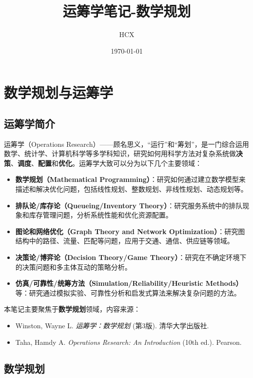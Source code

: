 \documentclass[12pt]{article}
\title{运筹学笔记-数学规划}
\author{HCX}
\date{\today}
\theoremstyle{plain}
\theoremstyle{definition}
\begin{document}
\pagestyle{fancy}

\maketitle

\tableofcontents
\newpage

\section{数学规划与运筹学}\label{sec:math_or}

\subsection{运筹学简介}\label{subsec:or_intro}

运筹学（Operations Research）——顾名思义，“运行”和“筹划”，是一门综合运用数学、统计学、计算机科学等多学科知识，研究如何用科学方法对复杂系统做\textbf{决策}、\textbf{调度}、\textbf{配置}和\textbf{优化}。运筹学大致可以分为以下几个主要领域：
\begin{itemize}
    \item \textbf{数学规划（Mathematical Programming）}：研究如何通过建立数学模型来描述和解决优化问题，包括线性规划、整数规划、非线性规划、动态规划等。
    \item \textbf{排队论/库存论（Queueing/Inventory Theory）}：研究服务系统中的排队现象和库存管理问题，分析系统性能和优化资源配置。
    \item \textbf{图论和网络优化（Graph Theory and Network Optimization）}：研究图结构中的路径、流量、匹配等问题，应用于交通、通信、供应链等领域。
    \item \textbf{决策论/博弈论（Decision Theory/Game Theory）}：研究在不确定环境下的决策问题和多主体互动的策略分析。
    \item \textbf{仿真/可靠性/统筹方法（Simulation/Reliability/Heuristic Methods）}等：研究通过模拟实验、可靠性分析和启发式算法来解决复杂问题的方法。
\end{itemize}
本笔记主要聚焦于\textbf{数学规划}领域，内容来源：
\begin{itemize}
    \item Winston, Wayne L. \textit{运筹学：数学规划} (第3版). 清华大学出版社.
    \item Taha, Hamdy A. \textit{Operations Research: An Introduction} (10th ed.). Pearson.
\end{itemize}

\subsection{数学规划}\label{subsec:math_planning}
\end{document}

